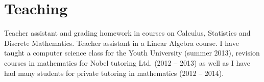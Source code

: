 \documentclass[11pt,a4paper,sans]{moderncv}
\begin{document}

\pagebreak
\section{Teaching}\label{sec:teaching}
{Teacher assistant and grading homework in courses on Calculus, Statistics
and Discrete Mathematics.}
{Teacher assistant in a Linear Algebra course.}
{I have taught a computer science class for the Youth University
(summer 2013), revision courses in mathematics for Nobel tutoring Ltd.
(2012 -- 2013) as well as I have had many students for private tutoring
in mathematics (2012 -- 2014).}
\end{document}
